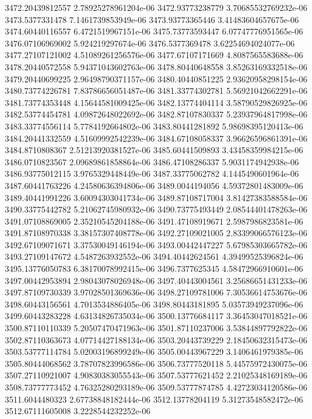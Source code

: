{3472.20439812557 2.78925278961204e-06
3472.93773238779 3.70685532769232e-06
3473.5377331478 7.1461739853949e-06
3473.93773365446 3.41483604657675e-06
3474.60440116557 6.4721519967151e-06
3475.73773593447 6.07747776951565e-06
3476.07106969002 5.924219297674e-06
3476.5377369478 3.62254694024077e-06
3477.27107121002 4.51089261256576e-06
3477.67107171669 4.8087565583688e-06
3478.20440572558 5.94371043602763e-06
3478.80440648558 3.85263169332518e-06
3479.20440699225 2.96498790371157e-06
3480.40440851225 2.93620958298154e-06
3480.73774226781 7.83786656051487e-06
3481.33774302781 5.56921042662291e-06
3481.73774353448 4.15644581009425e-06
3482.13774404114 3.58790529826925e-06
3482.53774454781 4.09872648022692e-06
3482.87107830337 5.23937964817998e-06
3483.33774556114 5.7784192664802e-06
3483.80441281892 5.98698395120413e-06
3484.20441332559 4.51609992542239e-06
3484.67108058337 3.96626596861391e-06
3484.8710808367 2.51213920381527e-06
3485.60441509893 3.43458359984215e-06
3486.0710823567 2.09689861858864e-06
3486.47108286337 5.9031174942938e-06
3486.93775012115 3.9765329448449e-06
3487.33775062782 4.1445490601964e-06
3487.60441763226 4.24580636394806e-06
3489.0044194056 4.59372801483009e-06
3489.40441991226 3.60094303041734e-06
3489.87108717004 3.81427383588584e-06
3490.33775442782 5.21062745980932e-06
3490.73775493449 2.08544401478263e-06
3491.07108869005 2.35210545204188e-06
3491.47108919671 2.5987986823581e-06
3491.87108970338 3.38157307408778e-06
3492.27109021005 2.83399066576123e-06
3492.67109071671 3.37530049146194e-06
3493.00442447227 5.67985303665782e-06
3493.27109147672 4.5487263932552e-06
3494.40442624561 4.39499525396824e-06
3495.13776050783 6.38170078992415e-06
3496.7377625345 4.58472966910601e-06
3497.00442953894 2.98043078026948e-06
3497.40443004561 3.25686651431233e-06
3497.87109730339 3.97028501369636e-06
3498.27109781006 7.30536614753676e-06
3498.60443156561 4.7013534886405e-06
3498.80443181895 5.03573949237096e-06
3499.60443283228 4.63134826735034e-06
3500.13776684117 3.36453047018521e-06
3500.87110110339 5.20507470471963e-06
3501.87110237006 3.53844897792822e-06
3502.87110363673 4.07714427188134e-06
3503.20443739229 2.18450632315473e-06
3503.53777114784 5.02003196899249e-06
3505.00443967229 3.1406461979385e-06
3505.80444068562 3.78707823996586e-06
3506.73777520118 5.44575972430075e-06
3507.27110921007 4.90830383055543e-06
3507.53777621452 2.21025348169189e-06
3508.73777773452 4.76325280293189e-06
3509.53777874785 4.42723034120586e-06
3511.6044480323 2.67738848182444e-06
3512.13778204119 5.31273548582472e-06
3512.67111605008 3.2228544232252e-06
}
